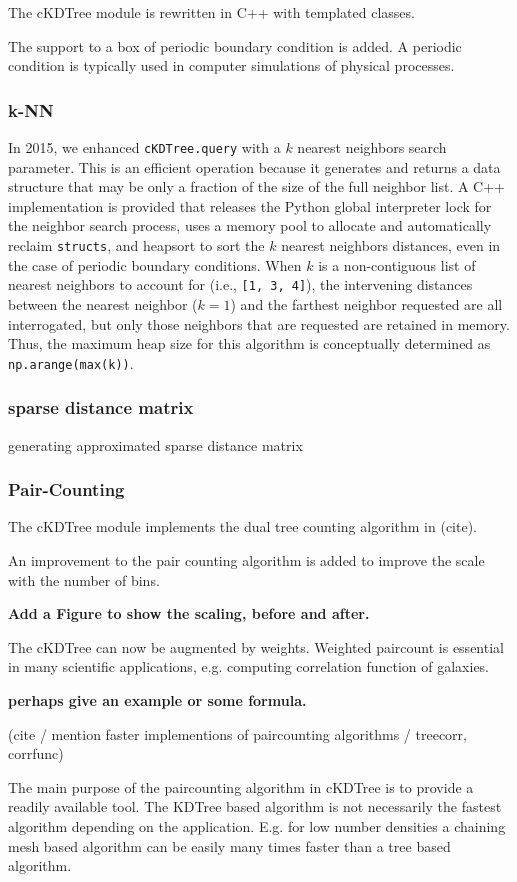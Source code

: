 The cKDTree module is rewritten in C++ with templated classes.

The support to a box of periodic boundary condition is added. A periodic
condition is typically used in computer simulations of physical processes.

\subsubsection{k-NN}

In 2015, we enhanced \texttt{cKDTree.query} with a $k$ nearest neighbors search
parameter. This is an efficient operation\cite{Sproull:1991:RNS:3118219.3118331} 
because it generates and returns a data structure that may be only a fraction 
of the size of the full neighbor list. A C++ implementation is provided that releases
the Python global interpreter lock for the neighbor search process, uses
a memory pool to allocate and automatically reclaim \texttt{structs}, and
heapsort to sort the $k$ nearest neighbors distances, even in the case
of periodic boundary conditions. When $k$ is a non-contiguous list of nearest
neighbors to account for (i.e., \texttt{[1, 3, 4]}), the intervening distances
between the nearest neighbor ($k = 1$) and the farthest neighbor requested
are all interrogated, but only those neighbors that are requested are retained
in memory. Thus, the maximum heap size for this algorithm is conceptually determined
as \texttt{np.arange(max(k))}.

\subsubsection{sparse distance matrix}

generating approximated sparse distance matrix

\subsubsection{Pair-Counting}

The cKDTree module implements the dual tree counting algorithm in (cite).

An improvement to the pair counting algorithm is added to improve the scale
with the number of bins.

\textbf{Add a Figure to show the scaling, before and after.}

The cKDTree can now be augmented by weights. Weighted paircount is essential
in many scientific applications, e.g. computing correlation function of galaxies.

\textbf{perhaps give an example or some formula.}

(cite / mention faster implementions of paircounting algorithms / treecorr, corrfunc)

The main purpose of the paircounting algorithm in cKDTree is to provide a readily
available tool. The KDTree based algorithm is not necessarily the fastest algorithm
depending on the application. E.g. for low number densities a chaining mesh based algorithm
can be easily many times faster than a tree based algorithm.


